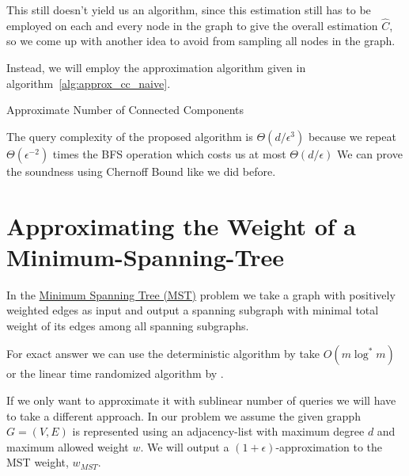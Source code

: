 This still doesn't yield us an algorithm, since this estimation still has to be employed on each and every node in the graph to give the overall estimation $\hat{C}$, so we come up with another idea to avoid from sampling all nodes in the graph.

Instead, we will employ the approximation algorithm given in algorithm~\ref{alg:approx_cc_naive}.
\begin{algorithm}[t]\label{alg:approx_cc_naive}

\caption{Approximate Number of Connected Components}
\end{algorithm}
The query complexity of the proposed algorithm is $\Theta(d/\epsilon^3)$ because we repeat $\Theta(\epsilon^{-2})$ times the BFS operation which costs us at most $\Theta(d/\epsilon)$
We can prove the soundness using Chernoff Bound like we did before.

\section{Approximating the Weight of a Minimum-Spanning-Tree}

In the \href{https://en.wikipedia.org/wiki/Minimum_spanning_tree}{Minimum Spanning Tree (MST)} problem we take a graph with positively weighted edges as input and output a spanning subgraph with minimal total weight of its edges among all spanning subgraphs.

For exact answer we can use the deterministic algorithm by \cite{chazelle2000minimum} take $O(m \log^* m)$ or the linear time randomized algorithm by \cite{karger1995randomized}.

If we only want to approximate it with sublinear number of queries we will have to take a different approach.
In our problem we assume the given grapph $G=(V,E)$ is represented using an adjacency-list with maximum degree $d$ and maximum allowed weight $w$.
We will output a $(1+\epsilon)$-approximation to the MST weight, $w_{MST}$.

